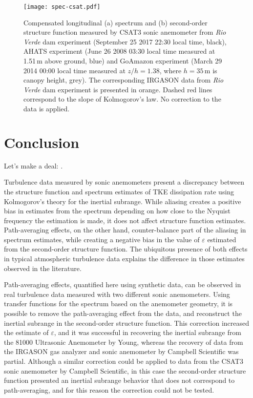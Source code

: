 \documentclass{svjour3}                     %
\begin{document}
\begin{figure}\centering
  \texttt{[image: spec-csat.pdf]}
  \caption{Compensated longitudinal (a) spectrum and (b) second-order
    structure function measured by CSAT3 sonic anemometer from
    \textit{Rio Verde} dam experiment (September 25 2017 22:30 local
    time, black), AHATS experiment (June 26 2008 03:30 local time
    measured at 1.51\,m above ground, blue) and GoAmazon experiment
    (March 29 2014 00:00 local time measured at $z/h = 1.38$, where $h
    = 35$\,m is canopy height, grey). The corresponding IRGASON data
    from \textit{Rio Verde} dam experiment is presented in
    orange. Dashed red lines correspond to the slope of Kolmogorov's
    law. No correction to the data is applied.\label{fig:csat}}
\end{figure}

\section{Conclusion}

Let's make a deal: \cite{LETSMAKEADEAL--INFO}.

Turbulence data measured by sonic anemometers present a discrepancy
between the structure function and spectrum estimates of TKE
dissipation rate using Kolmogorov's theory for the inertial
subrange. While aliasing creates a positive bias in estimates from the
spectrum depending on how close to the Nyquist frequency the
estimation is made, it does not affect structure function
estimates. Path-averaging effects, on the other hand, counter-balance
part of the aliasing in spectrum estimates, while creating a negative
bias in the value of $\varepsilon$ estimated from the second-order
structure function. The ubiquitous presence of both effects in typical
atmospheric turbulence data explains the difference in those estimates
observed in the literature.

Path-averaging effects, quantified here using synthetic
data, can be observed in real turbulence data measured with two different sonic
anemometers. Using transfer functions for the spectrum based on the anemometer
geometry, it is possible to remove the path-averaging
effect from the data, and reconstruct the inertial subrange in the
second-order structure function. This correction increased the estimate of
$\varepsilon$, and it was successful in recovering the inertial subrange
from the 81000 Ultrasonic Anemometer by Young, whereas the recovery of data from
the IRGASON gas analyzer and sonic anemometer by Campbell Scientific was
partial. Although a similar correction could be applied to data from the
CSAT3 sonic
anemometer by Campbell Scientific, in this case the second-order structure
function presented an inertial subrange behavior that does not correspond to
path-averaging, and for this reason the correction could not be tested.
\end{document}
